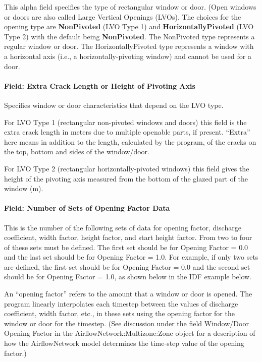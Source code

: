 This alpha field specifies the type of rectangular window or door. (Open windows or doors are also called Large Vertical Openings (LVOs). The choices for the opening type are \textbf{NonPivoted} (LVO Type 1) and \textbf{HorizontallyPivoted} (LVO Type 2) with the default being \textbf{NonPivoted}. The NonPivoted type represents a regular window or door. The HorizontallyPivoted type represents a window with a horizontal axis (i.e., a horizontally-pivoting window) and cannot be used for a door.

\paragraph{Field: Extra Crack Length or Height of Pivoting Axis}\label{field-extra-crack-length-or-height-of-pivoting-axis}

Specifies window or door characteristics that depend on the LVO type.

For LVO Type 1 (rectangular non-pivoted windows and doors) this field is the extra crack length in meters due to multiple openable parts, if present. ``Extra'' here means in addition to the length, calculated by the program, of the cracks on the top, bottom and sides of the window/door.

For LVO Type 2 (rectangular horizontally-pivoted windows) this field gives the height of the pivoting axis measured from the bottom of the glazed part of the window (m).

\paragraph{Field: Number of Sets of Opening Factor Data}\label{field-number-of-sets-of-opening-factor-data}

This is the number of the following sets of data for opening factor, discharge coefficient, width factor, height factor, and start height factor. From two to four of these sets must be defined. The first set should be for Opening Factor = 0.0 and the last set should be for Opening Factor = 1.0. For example, if only two sets are defined, the first set should be for Opening Factor = 0.0 and the second set should be for Opening Factor = 1.0, as shown below in the IDF example below.

An ``opening factor'' refers to the amount that a window or door is opened. The program linearly interpolates each timestep between the values of discharge coefficient, width factor, etc., in these sets using the opening factor for the window or door for the timestep. (See discussion under the field Window/Door Opening Factor in the Air\-flow\-Net\-work:\-Multi\-zone:\-Zone object for a description of how the Air\-flow\-Net\-work model determines the time-step value of the opening factor.)

